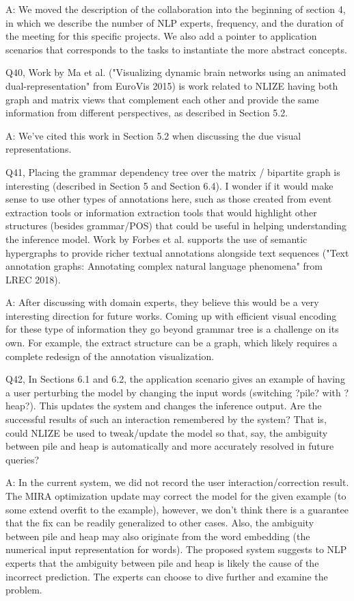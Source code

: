 A: We moved the description of the collaboration into the beginning of section 4, in which we describe the number of NLP experts, frequency, and the duration of the meeting for this specific projects. We also add a pointer to application scenarios that corresponds to the tasks to instantiate the more abstract concepts.

Q40, Work by Ma et al. ("Visualizing dynamic brain networks using an animated dual-representation" from EuroVis 2015) is work related to NLIZE having both graph and matrix views that complement each other and provide the same information from different perspectives, as described in Section 5.2.

A: We've cited this work in Section 5.2 when discussing the due visual representations.

Q41, Placing the grammar dependency tree over the matrix / bipartite graph is interesting (described in Section 5 and Section 6.4). I wonder if it would make sense to use other types of annotations here, such as those created from event extraction tools or information extraction tools that would highlight other structures (besides grammar/POS) that could be useful in helping understanding the inference model. Work by Forbes et al. supports the use of semantic hypergraphs to provide richer textual annotations alongside text sequences ("Text annotation graphs: Annotating complex natural language phenomena" from LREC 2018).

A: After discussing with domain experts, they believe this would be a very interesting direction for future works. Coming up with efficient visual encoding for these type of information they go beyond grammar tree is a challenge on its own. For example, the extract structure can be a graph, which likely requires a complete redesign of the annotation visualization.

Q42, In Sections 6.1 and 6.2, the application scenario gives an example of having a user perturbing the model by changing the input words (switching ?pile? with ?heap?). This updates the system and changes the inference output. Are the successful results of such an interaction remembered by the system? That is, could NLIZE be used to tweak/update the model so that, say, the ambiguity between pile and heap is automatically and more accurately resolved in future queries?

A: In the current system, we did not record the user interaction/correction result. The MIRA optimization update may correct the model for the given example (to some extend overfit to the example), however, we don't think there is a guarantee that the fix can be readily generalized to other cases. Also, the ambiguity between pile and heap may also originate from the word embedding (the numerical input representation for words). The proposed system suggests to NLP experts that the ambiguity between pile and heap is likely the cause of the incorrect prediction. The experts can choose to dive further and examine the problem.

